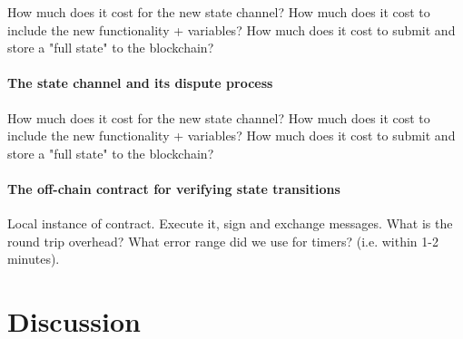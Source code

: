 \documentclass{llncs}
\begin{document}
How much does it cost for the new state channel? How much does it cost to include the new functionality + variables? How much does it cost to submit and store a "full state" to the blockchain?  

\paragraph{The state channel and its dispute process } 

How much does it cost for the new state channel? How much does it cost to include the new functionality + variables? How much does it cost to submit and store a "full state" to the blockchain?  

\paragraph{The off-chain contract for verifying state transitions} 

Local instance of contract. Execute it, sign and exchange messages. What is the round trip overhead? What error range did we use for timers? (i.e. within 1-2 minutes). 

\section{Discussion} 

\end{document}
